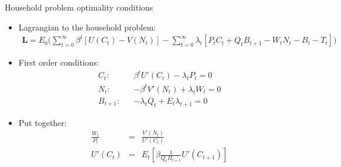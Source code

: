 \documentclass[9pt,xcolor={dvipsnames}]{beamer}
\newcommand{\bit}{\begin{itemize}}
\newcommand{\eit}{\end{itemize}}
\begin{document}
\begin{frame}{Household problem optimality conditions}

\bit
\setlength\itemsep{1.5em}

\item Lagrangian to the household problem:
\begin{eqnarray}
\mathbf{L} = E_0 \Bigg(\sum_{t=0}^{\infty} \beta^t \left[U(C_t)- V(N_t) \right]-\sum_{t=0}^{\infty} \lambda_t \left[ P_t C_t + Q_t B_{t+1} - W_t N_t - B_t - T_t \right] \Bigg) \nonumber
\end{eqnarray}

\item First order conditions:
\begin{eqnarray}
C_t: && \beta^t U'(C_t) - \lambda_t P_t = 0 \nonumber \\
N_t: && -\beta^t V'(N_t) + \lambda_tW_t = 0 \nonumber \\
B_{t+1}: && -\lambda_t Q_t   + E_t\lambda_{t+1}  = 0 \nonumber
\end{eqnarray}

\item Put together:
\begin{eqnarray}
\frac{W_t}{P_t} &=& \frac{V'(N_t)}{U'(C_t)}  \nonumber \\
U'(C_t) &=& E_t \left[\beta \frac{1}{Q_t \Pi_{t+1}} U'(C_{t+1})   \right] \nonumber
\end{eqnarray}
%

\eit

\end{frame}
\end{document}
